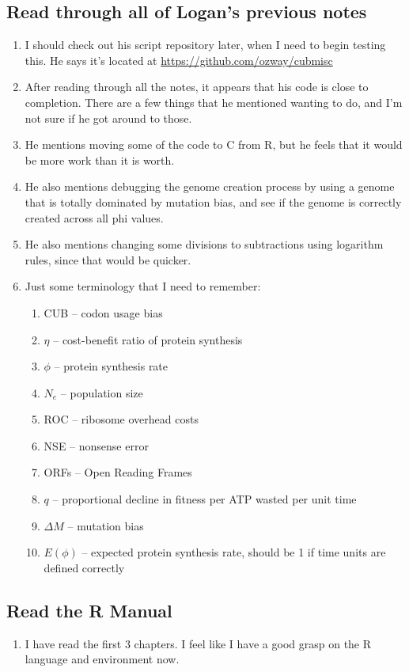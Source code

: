 \documentclass[12 pt]{article}
\begin{document}
	\subsection{Read through all of Logan's previous notes} 
		\begin{enumerate}
			\item I should check out his script repository later, when I need to begin testing this. He says it's located at \url{https://github.com/ozway/cubmisc}
			\item After reading through all the notes, it appears that his code is close to completion. There are a few things that he mentioned wanting to do, and I'm not sure if he got around to those.
			\item He mentions moving some of the code to C from R, but he feels that it would be more work than it is worth.
			\item He also mentions debugging the genome creation process by using a genome that is totally dominated by mutation bias, and see if the genome is correctly created across all phi values.
			\item He also mentions changing some divisions to subtractions using logarithm rules, since that would be quicker.
			
			\item Just some terminology that I need to remember:
			\begin{enumerate}
				\item CUB -- codon usage bias
				\item $ \eta $ -- cost-benefit ratio of protein synthesis
				\item $ \phi $ -- protein synthesis rate
				\item $ N_e $ -- population size
				\item ROC -- ribosome overhead costs
				\item NSE -- nonsense error
				\item ORFs -- Open Reading Frames
				\item $ q $ -- proportional decline in fitness per ATP wasted per unit time
				\item $ \Delta M $ -- mutation bias
				\item $ E(\phi) $ -- expected protein synthesis rate, should be 1 if time units are defined correctly
				
			\end{enumerate} 
		\end{enumerate}
		
		\subsection{Read the R Manual}
		\begin{enumerate}
			\item I have read the first 3 chapters. I feel like I have a good grasp on the R language and environment now.
		\end{enumerate}
		
\end{document}
